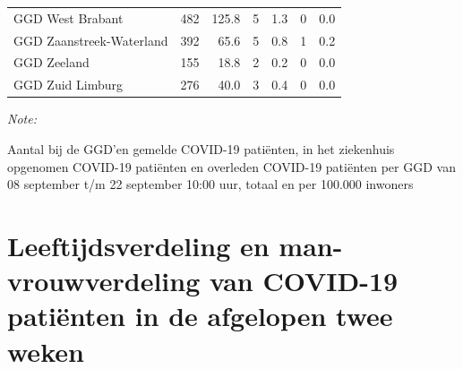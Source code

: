 \documentclass[
  english,
  man,floatsintext]{apa6}
\begin{document}
\begin{table}[H]
\begin{threeparttable}
\begin{tabular}{lrrrrrr}
GGD West Brabant & 482 & 125.8 & 5 & 1.3 & 0 & 0.0\\
GGD Zaanstreek-Waterland & 392 & 65.6 & 5 & 0.8 & 1 & 0.2\\
GGD Zeeland & 155 & 18.8 & 2 & 0.2 & 0 & 0.0\\
GGD Zuid Limburg & 276 & 40.0 & 3 & 0.4 & 0 & 0.0\\
\bottomrule
\end{tabular}
\begin{tablenotes}
\item \textit{Note: } 
\item Aantal bij de GGD’en gemelde COVID-19 patiënten, in het ziekenhuis opgenomen COVID-19 patiënten en overleden COVID-19 patiënten per GGD van 08 september t/m 22 september 10:00 uur, totaal en per 100.000 inwoners
\end{tablenotes}
\end{threeparttable}
\endgroup{}
\end{table}

\newpage

\hypertarget{leeftijdsverdeling-en-man-vrouwverdeling-van-covid-19-patiuxebnten-in-de-afgelopen-twee-weken}{%
\section{Leeftijdsverdeling en man-vrouwverdeling van COVID-19 patiënten in de afgelopen twee weken}\label{leeftijdsverdeling-en-man-vrouwverdeling-van-covid-19-patiuxebnten-in-de-afgelopen-twee-weken}}
\end{document}
